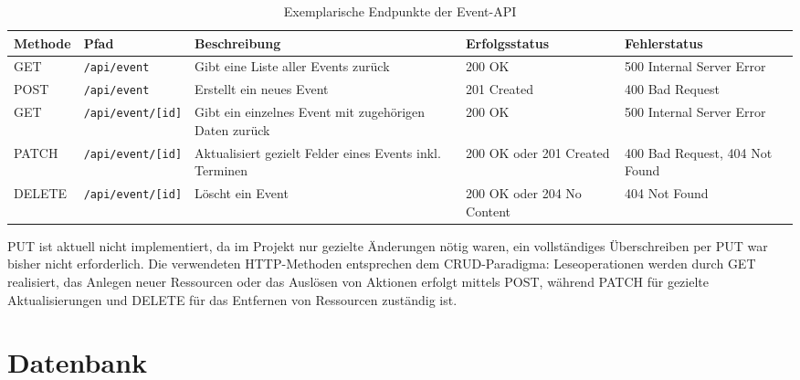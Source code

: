 \documentclass[a4paper,12pt]{article}
\begin{document}
\begin{table}[H]
\centering
\scriptsize
\begin{tabularx}{\textwidth}{|l|l|X|X|X|}
\hline
\textbf{Methode} & \textbf{Pfad} & \textbf{Beschreibung} & \textbf{Erfolgsstatus} & \textbf{Fehlerstatus} \\ \hline
GET    & \texttt{/api/event}         & Gibt eine Liste aller Events zurück                     & 200 OK                            & 500 Internal Server Error           \\ \hline
POST   & \texttt{/api/event}         & Erstellt ein neues Event                                & 201 Created                       & 400 Bad Request                     \\ \hline
GET    & \texttt{/api/event/[id]}    & Gibt ein einzelnes Event mit zugehörigen Daten zurück   & 200 OK                            & 500 Internal Server Error           \\ \hline
PATCH  & \texttt{/api/event/[id]}    & Aktualisiert gezielt Felder eines Events inkl. Terminen & 200 OK oder 201 Created           & 400 Bad Request, 404 Not Found      \\ \hline
DELETE & \texttt{/api/event/[id]}    & Löscht ein Event                                        & 200 OK oder 204 No Content        & 404 Not Found                       \\ \hline
\end{tabularx}
\caption{Exemplarische Endpunkte der Event-API}
\label{tab:api-events}
\end{table}

\noindent
PUT ist aktuell nicht implementiert, da im Projekt nur gezielte Änderungen nötig waren, ein vollständiges Überschreiben per PUT war bisher nicht erforderlich. Die verwendeten HTTP-Methoden entsprechen dem CRUD-Paradigma: Leseoperationen werden durch GET realisiert, das Anlegen neuer Ressourcen oder das Auslösen von Aktionen erfolgt mittels POST, während PATCH für gezielte Aktualisierungen und DELETE für das Entfernen von Ressourcen zuständig ist.

\newpage


\section{Datenbank}

\end{document}
